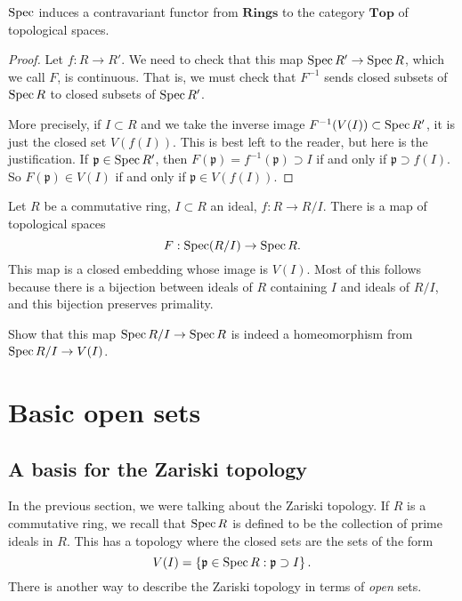 \begin{proposition} 
$\operatorname{Spec} $ induces a contravariant functor from $\mathbf{Rings}$
to the category
$\mathbf{Top}$ of topological spaces.
\end{proposition} 
\begin{proof} Let $f : R \to R'$. 
We need to check that this map $ \operatorname{Spec} R' \to \operatorname{Spec} R$, which we
call $F$, is
continuous.
That is, we must check that $F^{-1}$ sends closed
subsets of $\operatorname{Spec} R$ to closed subsets of $\operatorname{Spec} R'$.  

More precisely, if $I \subset
R$ and we take the inverse image $F^{-1}(V(I)) \subset \operatorname{Spec}
R'$, it is just
the closed set $V(f(I))$. This is best left to the reader, but
here is the justification. If $\mathfrak{p} \in \operatorname{Spec} R'$, then
$F(\mathfrak{p}) = f^{-1}(\mathfrak{p})
\supset I$ if and only if $\mathfrak{p} \supset f(I)$. So
$F(\mathfrak{p}) \in
V(I)$ if and only if $\mathfrak{p} \in V(f(I))$.

\end{proof} 



\begin{example} 
Let $R$ be a commutative ring, $I \subset R$ an ideal, $f: R \to
R/I$. There is a map
of topological spaces
\[ F: \operatorname{Spec} (R/I) \to \operatorname{Spec} R  .\]
This map is a closed embedding whose image is $V(I)$. Most of
this follows because
there is a bijection between ideals of $R$ containing $I$ and
ideals of $R/I$, and this bijection preserves primality.

\begin{exercise} 
Show that this map $\operatorname{Spec} R/I \to \operatorname{Spec} R$ is indeed a
homeomorphism from $\operatorname{Spec} R/I
\to V(I)$.  
\end{exercise} 
\end{example} 

\section{Basic open sets}

\subsection{A basis for the Zariski topology}
In the previous section, we were talking about the Zariski
topology. If $R$ is a
commutative ring, we recall that $\operatorname{Spec} R$ is defined to be the
collection of
prime ideals in $R$. This has a topology where the closed sets
are the sets of
the form
\[ V(I) = \left\{\mathfrak{p} \in \operatorname{Spec} R: \mathfrak{p} \supset
I\right\} . \]
There is another way to describe the Zariski topology in terms
of
\emph{open} sets.  

